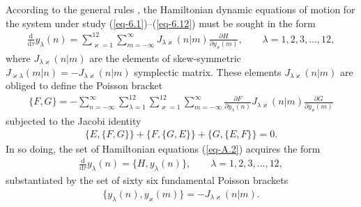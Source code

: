 \documentclass[10pt,a4paper]{amsart}
\numberwithin{equation}{section}
\begin{document}
According to the general rules \cite{maschke-JFI-329-923, torres-del-castillo-RMF-50-608}, the Hamiltonian dynamic equations of motion for the system under study (\ref{eq-6.1})--(\ref{eq-6.12}) must be sought in the form
\begin{gather}\label{eq-A.2}
	\frac{\mathrm{d}}{\mathrm{d}\tau}y_\lambda(n) = \sum_{\varkappa=1}^{12} \sum_{m=-\infty}^\infty J_{\lambda\varkappa}(n|m)
	\frac{\partial H}{\partial y_{\varkappa}(m)},\qquad \lambda = 1, 2, 3, \dots, 12 ,
\end{gather}
where $J_{\lambda\varkappa}(n|m)$ are the elements of skew-symmetric $J_{\varkappa\lambda}(m|n)=-J_{\lambda\varkappa}(n|m)$ symplectic matrix. These elements $J_{\lambda\varkappa}(n|m)$ are obliged to define the Poisson bracket
\begin{gather}\label{eq-A.3}
	\{F,G\} = -\sum_{n=-\infty}^\infty \sum_{\lambda=1}^{12} \sum_{\varkappa=1}^{12} \sum_{m=-\infty}^\infty \frac{\partial F}{\partial y_{\lambda}(n)} J_{\lambda\varkappa}(n|m) \frac{\partial G}{\partial y_{\varkappa}(m)}
\end{gather}
subjected to the Jacobi identity
\begin{gather}\label{eq-A.4}
	\{E,\{F,G \} \} +\{F,\{G,E \} \} +\{G,\{E,F \} \}=0 .
\end{gather}
In so doing, the set of Hamiltonian equations (\ref{eq-A.2}) acquires the form
\begin{gather}\label{eq-A.5}
	\frac{\mathrm{d}}{\mathrm{d}\tau}y_\lambda(n) = \{H, y_{\lambda}(n)\},\qquad \lambda = 1, 2, 3, \dots , 12,
\end{gather}
substantiated by the set of sixty six fundamental Poisson brackets
\begin{gather}\label{eq-A.6}
\{ y_{\lambda}(n), y_{\varkappa}(m)\} = - J_{\lambda\varkappa}(n|m) .
\end{gather}
\end{document}
